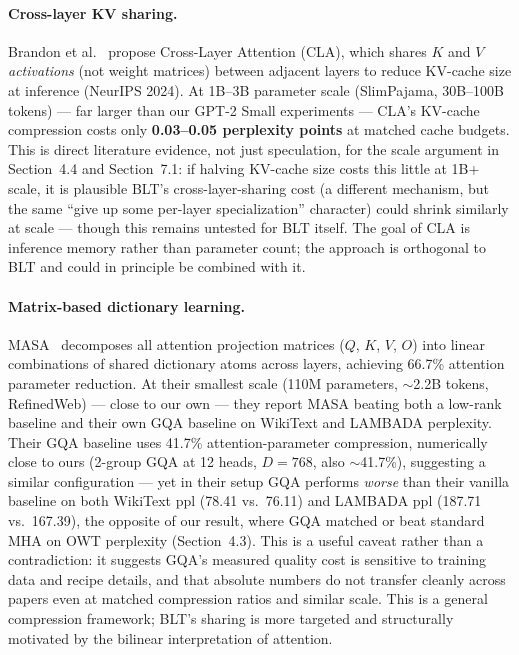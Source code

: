\documentclass[11pt]{article}
\begin{document}
\paragraph{Cross-layer KV sharing.} Brandon et al.~\cite{brandon2024cla} propose Cross-Layer Attention (CLA), which shares $K$ and $V$ \emph{activations} (not weight matrices) between adjacent layers to reduce KV-cache size at inference (NeurIPS 2024). At 1B--3B parameter scale (SlimPajama, 30B--100B tokens) --- far larger than our GPT-2 Small experiments --- CLA's KV-cache compression costs only \textbf{0.03--0.05 perplexity points} at matched cache budgets. This is direct literature evidence, not just speculation, for the scale argument in Section~4.4 and Section~7.1: if halving KV-cache size costs this little at 1B+ scale, it is plausible BLT's cross-layer-sharing cost (a different mechanism, but the same ``give up some per-layer specialization'' character) could shrink similarly at scale --- though this remains untested for BLT itself. The goal of CLA is inference memory rather than parameter count; the approach is orthogonal to BLT and could in principle be combined with it.

\paragraph{Matrix-based dictionary learning.} MASA~\cite{masa2025} decomposes all attention projection matrices ($Q$, $K$, $V$, $O$) into linear combinations of shared dictionary atoms across layers, achieving 66.7\% attention parameter reduction. At their smallest scale (110M parameters, $\sim$2.2B tokens, RefinedWeb) --- close to our own --- they report MASA beating both a low-rank baseline and their own GQA baseline on WikiText and LAMBADA perplexity. Their GQA baseline uses 41.7\% attention-parameter compression, numerically close to ours (2-group GQA at 12 heads, $D=768$, also $\sim$41.7\%), suggesting a similar configuration --- yet in their setup GQA performs \emph{worse} than their vanilla baseline on both WikiText ppl (78.41 vs.\ 76.11) and LAMBADA ppl (187.71 vs.\ 167.39), the opposite of our result, where GQA matched or beat standard MHA on OWT perplexity (Section~4.3). This is a useful caveat rather than a contradiction: it suggests GQA's measured quality cost is sensitive to training data and recipe details, and that absolute numbers do not transfer cleanly across papers even at matched compression ratios and similar scale. This is a general compression framework; BLT's sharing is more targeted and structurally motivated by the bilinear interpretation of attention.
\end{document}
